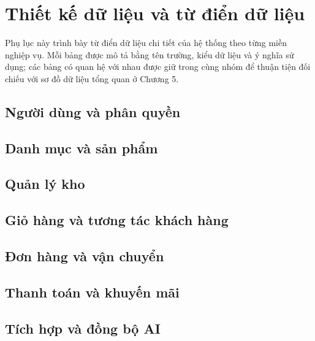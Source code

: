 
\section{Thiết kế dữ liệu và từ điển dữ liệu}
\label{data-dictionary}

Phụ lục này trình bày từ điển dữ liệu chi tiết của hệ thống theo từng miền
nghiệp vụ. Mỗi bảng được mô tả bằng tên trường, kiểu dữ liệu và ý nghĩa sử dụng;
các bảng có quan hệ với nhau được giữ trong cùng nhóm để thuận tiện đối chiếu
với sơ đồ dữ liệu tổng quan ở Chương 5.

\subsection{Người dùng và phân quyền}


\subsection{Danh mục và sản phẩm}


\subsection{Quản lý kho}


\subsection{Giỏ hàng và tương tác khách hàng}


\subsection{Đơn hàng và vận chuyển}


\subsection{Thanh toán và khuyến mãi}


\subsection{Tích hợp và đồng bộ AI}

